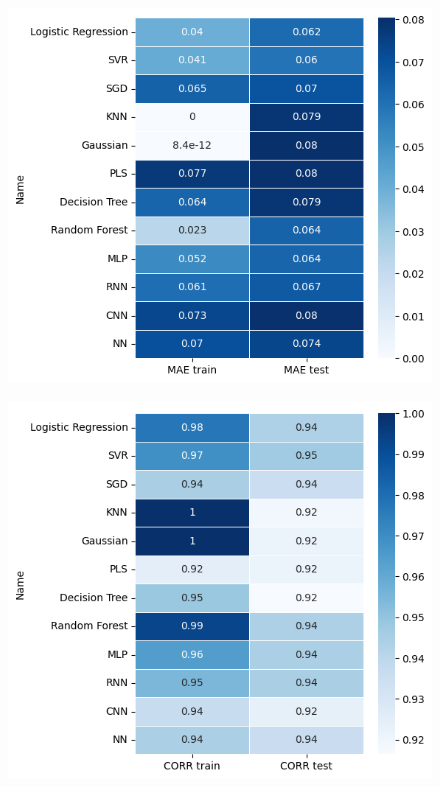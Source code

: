 \begin{figure}[H]
    \centering
    \includegraphics[width=\textwidth]{images/mae.png}
    \caption{}
    \label{mae}
\end{figure}

\begin{figure}[H]
    \centering
    \includegraphics[width=\textwidth]{images/corr.png}
    \caption{}
    \label{corr}
\end{figure}

